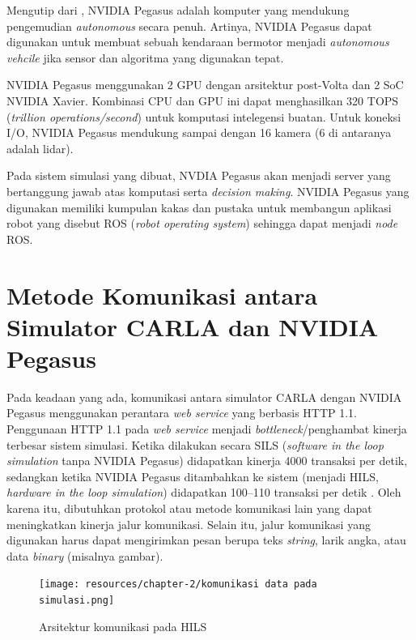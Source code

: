 Mengutip dari \parencite{oh_2017}, NVIDIA Pegasus adalah komputer yang mendukung
pengemudian \textit{autonomous} secara penuh. Artinya, NVIDIA Pegasus dapat
digunakan untuk membuat sebuah kendaraan bermotor menjadi \textit{autonomous
	vehcile} jika sensor dan algoritma yang digunakan tepat.

NVIDIA Pegasus menggunakan 2 GPU dengan arsitektur post-Volta dan 2 SoC NVIDIA
Xavier. Kombinasi CPU dan GPU ini dapat menghasilkan 320 TOPS (\textit{trillion
	operations/second}) untuk komputasi intelegensi buatan. Untuk koneksi I/O,
NVIDIA Pegasus mendukung sampai dengan 16 kamera (6 di antaranya adalah lidar).

Pada sistem simulasi yang dibuat, NVDIA Pegasus akan menjadi server yang
ber\-tang\-gung jawab atas komputasi serta \textit{decision making}. NVIDIA
Pegasus yang digunakan memiliki kumpulan kakas dan pustaka untuk membangun
aplikasi robot yang disebut ROS (\textit{robot operating system}) sehingga dapat
menjadi \textit{node} ROS.

\section{Metode Komunikasi antara Simulator CARLA dan NVI\-DI\-A Pegasus}

Pada keadaan yang ada, komunikasi antara simulator CARLA dengan NVIDIA Pegasus
menggunakan perantara \textit{web service} yang berbasis HTTP 1.1. Penggunaan
HTTP 1.1 pada \textit{web service} menjadi \textit{bottleneck}/penghambat
kinerja terbesar sistem simulasi. Ketika dilakukan secara SILS (\textit{software
	in the loop simulation} tanpa NVIDIA Pegasus) didapatkan kinerja 4000 transaksi
per detik, sedangkan ketika NVIDIA Pegasus ditambahkan ke sistem (menjadi HILS,
\textit{hardware in the loop simulation}) didapatkan 100--110 transaksi per
detik \parencite{trilaksono_laporanRispro}. Oleh karena itu, dibutuhkan protokol
atau metode komunikasi lain yang dapat meningkatkan kinerja jalur komunikasi.
Selain itu, jalur komunikasi yang digunakan harus dapat mengirimkan pesan berupa
teks \textit{string}, larik angka, atau data \textit{binary} (misalnya gambar).

\begin{center}
	\begin{figure}
		\texttt{[image: resources/chapter-2/komunikasi
			data pada simulasi.png]}
		\caption{Arsitektur komunikasi pada HILS
			\parencite{trilaksono_laporanRispro}}
	\end{figure}
\end{center}


